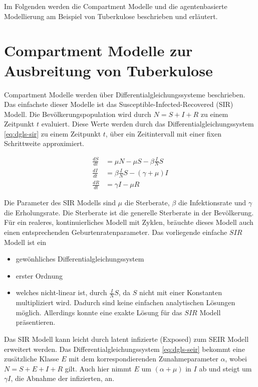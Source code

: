 \documentclass[paper=a4, fontsize=11pt, ngerman, abstract=on]{scrartcl}
\numberwithin{equation}{section} %
\numberwithin{figure}{section} %
\numberwithin{table}{section} %
\begin{document}
Im Folgenden werden die Compartment Modelle und die agentenbasierte Modellierung am Beispiel von Tuberkulose beschrieben und erläutert.

\section{Compartment Modelle zur Ausbreitung von Tuberkulose}

Compartment Modelle werden über Differentialgleichungssysteme beschrieben. Das einfachste dieser Modelle ist das Susceptible-Infected-Recovered (SIR) Modell. Die Bevölkerungspopulation wird durch $N = S + I + R$ zu einem Zeitpunkt $t$ evaluiert. Diese Werte werden durch das Differentialgleichungssystem \ref{eq:dgls-sir} zu einem Zeitpunkt $t$, über ein Zeitintervall mit einer fixen Schrittweite approximiert. \cite{MathOfInfectiousDiseases2000}

\begin{equation}
\begin{split}
\frac{dS}{dt} &= \mu N - \mu S - \beta \frac{I}{N}S \\
\frac{dI}{dt} &= \beta \frac{I}{N}S - (\gamma + \mu)I \\
\frac{dR}{dt} &= \gamma I - \mu R
\end{split}
\label{eq:dgls-sir}
\end{equation}

Die Parameter des SIR Modells sind $\mu$ die Sterberate, $\beta$ die Infektionsrate und $\gamma$ die Erholungsrate. Die Sterberate ist die generelle Sterberate in der Bevölkerung. Für ein realeres, kontinuierliches Modell mit Zyklen, bräuchte dieses Modell auch einen entsprechenden Geburtenratenparameter. Das vorliegende einfache $SIR$ Modell ist ein

\begin{itemize}
\item{gewönhliches Differentialgleichungssystem}
\item{erster Ordnung}
\item{welches nicht-linear ist, durch $\frac{I}{N}S$, da $S$ nicht mit einer Konstanten multipliziert wird. Dadurch sind keine einfachen analytischen Lösungen möglich. Allerdings konnte \cite{Harko2014} eine exakte Lösung für das $SIR$ Modell präsentieren.}
\end{itemize}

Das SIR Modell kann leicht durch latent infizierte (Exposed) zum SEIR Modell erweitert werden. Das Differentialgleichungssystem \ref{eq:dgls-seir} bekommt eine zusätzliche Klasse $E$ mit dem korrespondierenden Zunahmeparameter $\alpha$, wobei $N = S + E + I + R$ gilt. Auch hier nimmt $E$ um $(\alpha + \mu)$ in $I$ ab und steigt um $\gamma I$, die Abnahme der infizierten, an. \cite{MathOfInfectiousDiseases2000}
\end{document}
